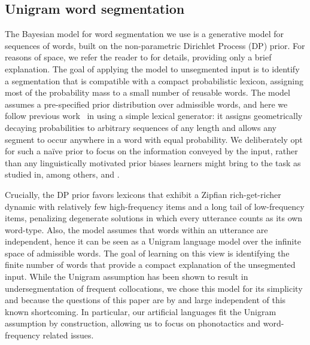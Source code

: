 \documentclass[11pt]{article}
\begin{document}
\subsection{Unigram word segmentation}

The Bayesian model for word segmentation we use is a generative model for sequences of words, built on the non-parametric Dirichlet Process (DP) prior. For reasons of space, we refer the reader to \cite{Goldwater07c} for details, providing only a brief explanation. The goal of applying the model to unsegmented input is to identify a segmentation that is compatible with a compact probabilistic lexicon, assigning most of the probability mass to a small number of reusable words. The model assumes a pre-specified prior distribution over admissible words, and here we follow previous work~\cite{Brent99a,Goldwater07c} in using a simple lexical generator: it assigns geometrically decaying probabilities to arbitrary sequences of any length and allows any segment to occur anywhere in a word with equal probability. We deliberately opt for such a na\"{i}ve prior to focus on the information conveyed by the input, rather than any linguistically motivated prior biases learners might bring to the task as studied in, among others, \cite{Johnson09a} and \cite{Borschinger12b}.

Crucially, the DP prior favors lexicons that exhibit a Zipfian rich-get-richer dynamic with relatively few high-frequency items and a long tail of low-frequency items, penalizing degenerate solutions in which every utterance counts as its own word-type. Also, the model assumes that words within an utterance are independent, hence it can be seen as a Unigram language model over the infinite space of admissible words. The goal of learning on this view is identifying the finite number of words that provide a compact explanation of the unsegmented input. While the Unigram assumption has been shown to result in undersegmentation of frequent collocations, we chose this model for its simplicity and because the questions of this paper are by and large independent of this known shortcoming. In particular, our artificial languages fit the Unigram assumption by construction, allowing us to focus on phonotactics and word-frequency related issues.
\end{document}
